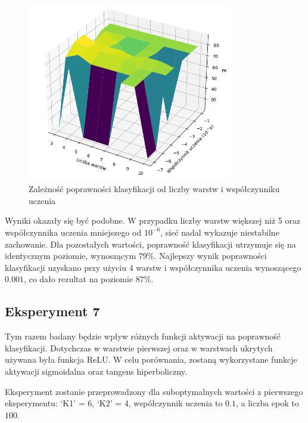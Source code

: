\documentclass{article}
\begin{document}
\begin{figure}[H]
    \centering
    \includegraphics[width=0.8\textwidth, keepaspectratio]{LR_LAYERS_1500_1000K1K2.PNG}
    \caption{Zależność poprawności klasyfikacji od liczby warstw i współczynniku uczenia}
    \label{fig:lr_layers_3}
\end{figure}

Wyniki okazały się być podobne.
W przypadku liczby warstw większej niż 5 oraz współczynnika uczenia mniejszego od $10^{-6}$, sieć nadal wykazuje niestabilne zachowanie.
Dla pozostałych wartości, poprawność klasyfikacji utrzymuje się na identycznym poziomie, wynoszącym $79\%$.
Najlepszy wynik poprawności klasyfikacji uzyskano przy użyciu 4 warstw i współczynnika uczenia wynoszącego $0.001$, co dało rezultat na poziomie $87\%$.

\subsection{Eksperyment 7}
Tym razem badany będzie wpływ różnych funkcji aktywacji na poprawność klasyfikacji.
Dotychczas w warstwie pierwszej oraz w warstwach ukrytych używana była funkcja ReLU.
W celu porównania, zostaną wykorzystane funkcje aktywacji sigmoidalna oraz tangens hiperboliczny.

Eksperyment zostanie przeprowadzony dla suboptymalnych wartości z pierwszego eksperymentu: `K1' = 6, `K2' = 4, współczynnik uczenia to $0.1$, a liczba epok to $100$.
\end{document}
